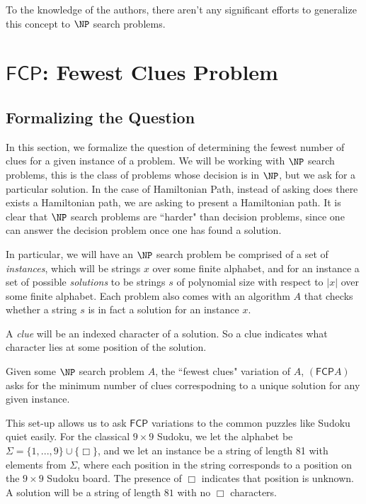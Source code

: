 \documentclass[runningheads,a4paper]{llncs}
\begin{document}
To the knowledge of the authors, there aren't any significant efforts to generalize this concept to $\NP$ search problems. 

\section{$\mathsf{FCP}$: Fewest Clues Problem}
\label{sec:prelim}

\subsection{Formalizing the Question}

In this section, we formalize the question of determining the fewest number of clues for a given instance of a problem. We will be working with $\NP$ search problems, this is the class of problems whose decision is in $\NP$, but we ask for a particular solution. In the case of Hamiltonian Path, instead of asking does there exists a Hamiltonian path, we are asking to present a Hamiltonian path. It is clear that $\NP$ search problems are ``harder" than decision problems, since one can answer the decision problem once one has found a solution.

In particular, we will have an $\NP$ search problem be comprised of a set of \emph{instances}, which will be strings $x$ over some finite alphabet, and for an instance a set of possible \emph{solutions} to be strings $s$ of polynomial size with respect to $|x|$ over some finite alphabet. Each problem also comes with an algorithm $A$ that checks whether a string $s$ is in fact a solution for an instance $x$.

A \emph{clue} will be an indexed character of a solution. So a clue indicates what character lies at some position of the solution.

\begin{definition}
Given some $\NP$ search problem $A$, the ``fewest clues" variation of $A$, $(\mathsf{FCP} A)$ asks for the minimum number of clues correspodning to a unique solution for any given instance.
\end{definition}

This set-up allows us to ask $\mathsf{FCP}$ variations to the common puzzles like Sudoku quiet easily. For the classical $9 \times 9$ Sudoku, we let the alphabet be $\Sigma = \{ 1, ..., 9 \} \cup \{ \Box \}$, and we let an instance be a string of length 81 with elements from $\Sigma$, where each position in the string corresponds to a position on the $9 \times 9$ Sudoku board. The presence of $\Box$ indicates that position is unknown. A solution will be a string of length $81$ with no $\Box$ characters. 
\end{document}
